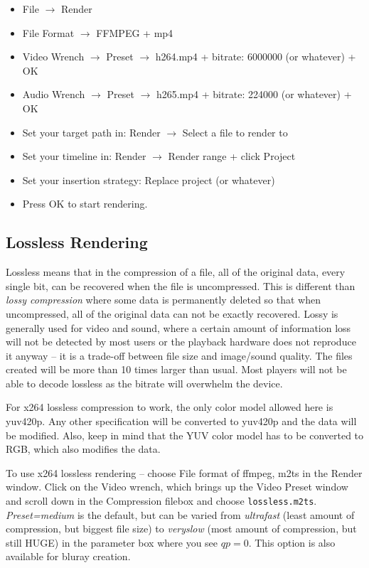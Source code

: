 \begin{itemize}
	\item File $\rightarrow$ Render
	\item File Format $\rightarrow$ FFMPEG + mp4
	\item Video Wrench $\rightarrow$ Preset $\rightarrow$ h264.mp4 +
	bitrate: 6000000 (or whatever) + OK
	\item Audio Wrench $\rightarrow$ Preset $\rightarrow$ h265.mp4 +
	bitrate: 224000 (or whatever) + OK
	\item Set your target path in: Render $\rightarrow$ Select a file to
	render to
	\item Set your timeline in: Render $\rightarrow$ Render range +
	click Project
	\item Set your insertion strategy: Replace project (or whatever)
	\item Press OK to start rendering.
\end{itemize}

\subsection{Lossless Rendering}%
\label{sub:loseeless_rendering}

Lossless means that in the compression of a file, all of the
original data, every single bit, can be recovered when the file is
uncompressed.  This is different than \textit{lossy compression}
where some data is permanently deleted so that when uncompressed,
all of the original data can not be exactly recovered.  Lossy is
generally used for video and sound, where a certain amount of
information loss will not be detected by most users or the playback
hardware does not reproduce it anyway -- it is a trade-off between
file size and image/sound quality.  The files created will be more
than 10 times larger than usual.  Most players will not be able to
decode lossless as the bitrate will overwhelm the device.

For x264 lossless compression to work, the only color model allowed
here is yuv420p.  Any other specification will be converted to
yuv420p and the data will be modified.  Also, keep in mind that the
YUV color model has to be converted to RGB, which also modifies the
data.

To use x264 lossless rendering -- choose File format of ffmpeg, m2ts
in the Render window.  Click on the Video wrench, which brings up
the Video Preset window and scroll down in the Compression filebox
and choose \texttt{lossless.m2ts}.  \textit{Preset=medium} is the
default, but can be varied from \textit{ultrafast} (least amount of
compression, but biggest file size) to \textit{veryslow} (most
amount of compression, but still HUGE) in the parameter box where
you see $qp=0$.  This option is also available for bluray creation.


